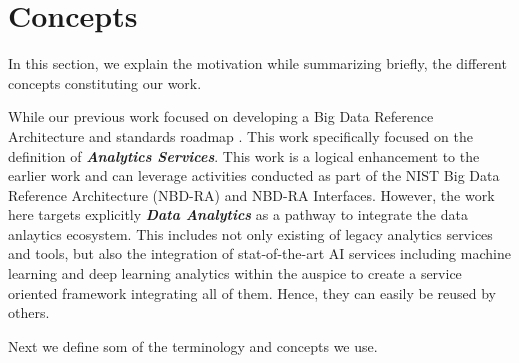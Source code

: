 

\section{Concepts}\label{s:background}

In this section, we explain the motivation while summarizing briefly,
the different concepts constituting our work.

While our previous work focused on developing a Big Data Reference
Architecture and  standards roadmap \cite{nist-v8}. This work
specifically focused on the definition of {\bf\em Analytics Services}.
This work is a logical enhancement to the earlier work and can
leverage activities conducted as part of the NIST Big Data Reference
Architecture (NBD-RA) and NBD-RA Interfaces.  However, the work here
targets explicitly {\bf\em Data Analytics} as a pathway to integrate
the data anlaytics ecosystem. This includes not only existing of
legacy analytics services and tools, but also the integration of
stat-of-the-art AI services including machine learning and deep
learning analytics within the auspice to create a service oriented
framework integrating all of them. Hence, they can easily be reused by
others.

Next we define som of the terminology and concepts we use.


